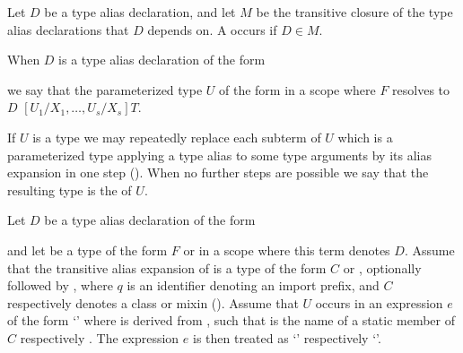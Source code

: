 \documentclass[makeidx]{article}
\begin{document}
{\LMHash{}%
Let $D$ be a type alias declaration,
and let $M$ be the transitive closure of
the type alias declarations that $D$ depends on.
A  occurs if $D \in M$.



\LMHash{}%
When $D$ is a type alias declaration of the form

\noindent
{}

\noindent
we say that the parameterized type $U$ of the form
in a scope where $F$ resolves to $D$
$[U_1/X_1, \ldots, U_s/X_s]T$.


\LMHash{}%
If $U$ is a type we may repeatedly replace each subterm of $U$
which is a parameterized type applying a type alias to some type arguments
by its alias expansion in one step
().
When no further steps are possible we say that the resulting type is the
of $U$.


\LMHash{}%
%
Let $D$ be a type alias declaration of the form

\noindent
{}

\noindent
and let  be a type of the form $F$ or 
in a scope where this term denotes $D$.
Assume that the transitive alias expansion of  is
%
a type of the form $C$ or ,
optionally followed by ,
where $q$ is an identifier denoting an import prefix,
and $C$ respectively  denotes a class or mixin
().
Assume that $U$ occurs in an expression $e$ of the form
`'
where  is derived from ,
such that \id{} is the name of
a static member of $C$ respectively .
The expression $e$ is then treated as
`'
respectively
`'.

}
\end{document}
